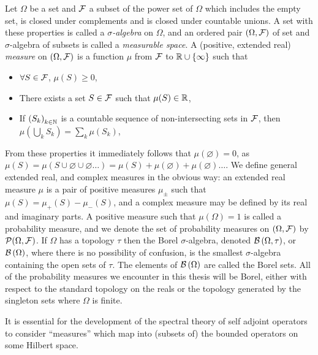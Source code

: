 Let $\Omega$ be a set and $\mathcal{F}$ a subset of the power set of $\Omega$ which includes the empty set, is closed under complements and is closed under countable unions. A set with these properties is called a \emph{$\sigma$-algebra} on $\Omega$, and an ordered pair $(\Omega, \mathcal{F})$ of set and $\sigma$-algebra of subsets is called a \emph{measurable space}. A (positive, extended real) \emph{measure} on $(\Omega, \mathcal{F})$ is a function $\mu$ from $\mathcal{F}$ to $\mathbb{R}\cup \{\infty\}$ such that
\begin{itemize}
  \item $\forall S\in\mathcal{F} $, $\mu(S)\geq 0$,
  \item There exists a set $S\in\mathcal{F}$ such that $\mu(S) \in\mathbb{R}$,
  \item If $\seq{S_k}[k\in\N]$ is a countable sequence of non-intersecting sets in $\mathcal{F}$, then $\mu(\bigcup_k S_k) = \sum_k\mu(S_k)$,
\end{itemize}
From these properties it immediately follows that $\mu(\varnothing) = 0$, as $\mu(S) = \mu(S \cup \varnothing\cup\varnothing\ldots) = \mu(S) + \mu(\varnothing) + \mu(\varnothing)\ldots$. We define general extended real, and complex measures in the obvious way: an extended real measure $\mu$ is a pair of positive measures $\mu_\pm$ such that $\mu(S) = \mu_+(S) - \mu_-(S)$, and a complex measure may be defined by its real and imaginary parts. A positive measure such that $\mu(\Omega) = 1$ is called a probability measure, and we denote the set of probability measures on $(\Omega,\mathcal{F})$ by $\mathcal{P}\!\left({\Omega}, {\mathcal{F}}\right)$. If $\Omega$ has a topology $\tau$ then the Borel $\sigma$-algebra, denoted $\borel{\Omega}[\tau]$, or $\borel{\Omega}$, where there is no possibility of confusion, is the smallest $\sigma$-algebra containing the open sets of $\tau$. The elements of $\borel{\Omega}$ are called the Borel sets. All of the probability measures we encounter in this thesis will be Borel, either with respect to the standard topology on the reals or the topology generated by the singleton sets where $\Omega$ is finite.

It is essential for the development of the spectral theory of self adjoint operators to consider ``measures'' which map into (subsets of) the bounded operators on some Hilbert space.

